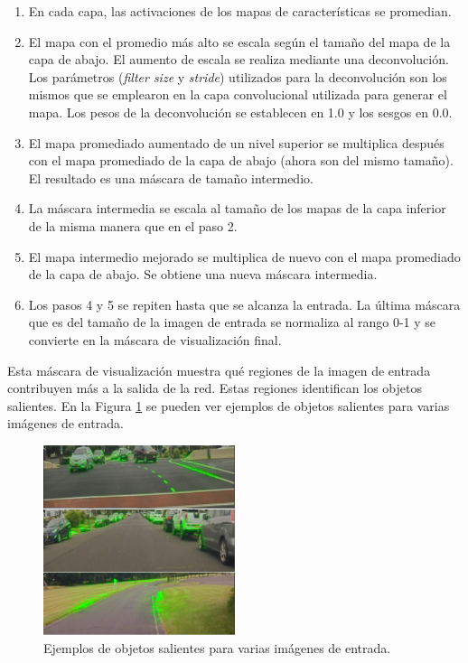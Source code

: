 \begin{enumerate}
    \item En cada capa, las activaciones de los mapas de características se promedian.
    \item El mapa con el promedio más alto se escala según el tamaño del mapa de la capa de abajo. El aumento de escala se realiza mediante una deconvolución. Los parámetros (\textit{filter size} y \textit{stride}) utilizados para la deconvolución son los mismos que se emplearon en la capa convolucional utilizada para generar el mapa. Los pesos de la deconvolución se establecen en 1.0 y los sesgos en 0.0.
    \item El mapa promediado aumentado de un nivel superior se multiplica después con el mapa promediado de la capa de abajo (ahora son del mismo tamaño). El resultado es una máscara de tamaño intermedio.
    \item La máscara intermedia se escala al tamaño de los mapas de la capa inferior de la misma manera que en el paso 2.
    \item El mapa intermedio mejorado se multiplica de nuevo con el mapa promediado de la capa de abajo. Se obtiene una nueva máscara intermedia.
    \item Los pasos 4 y 5 se repiten hasta que se alcanza la entrada. La última máscara que es del tamaño de la imagen de entrada se normaliza al rango 0-1 y se convierte en la máscara de visualización final.
\end{enumerate}

Esta máscara de visualización muestra qué regiones de la imagen de entrada contribuyen más a la salida de la red. Estas regiones identifican los objetos salientes. En la Figura \ref{fig.salient} se pueden ver ejemplos de objetos salientes para varias imágenes de entrada.\\

\begin{figure}
\begin{center}
	\includegraphics[width=0.5\textwidth]{figures/Estado_arte/saliencia.png}
   \caption{Ejemplos de objetos salientes para varias imágenes de entrada.}
	\label{fig.salient}
\end{center}
\end{figure}

